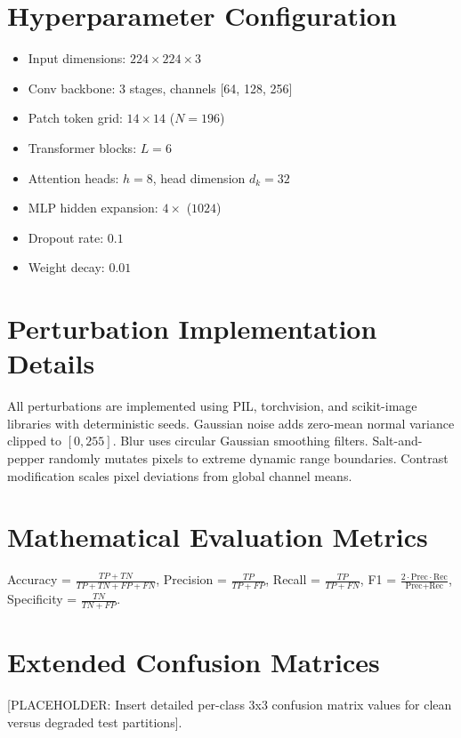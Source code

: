 \documentclass[conference]{IEEEtran}
\begin{document}



\appendices

\section{Hyperparameter Configuration}
\label{app:hyperparameters}
\begin{itemize}
    \item Input dimensions: $224 \times 224 \times 3$
    \item Conv backbone: 3 stages, channels [64, 128, 256]
    \item Patch token grid: $14 \times 14$ ($N=196$)
    \item Transformer blocks: $L = 6$
    \item Attention heads: $h = 8$, head dimension $d_k = 32$
    \item MLP hidden expansion: $4\times$ ($1024$)
    \item Dropout rate: $0.1$
    \item Weight decay: $0.01$
\end{itemize}

\section{Perturbation Implementation Details}
\label{app:perturbations}
All perturbations are implemented using PIL, torchvision, and scikit-image libraries with deterministic seeds. Gaussian noise adds zero-mean normal variance clipped to $[0, 255]$. Blur uses circular Gaussian smoothing filters. Salt-and-pepper randomly mutates pixels to extreme dynamic range boundaries. Contrast modification scales pixel deviations from global channel means.

\section{Mathematical Evaluation Metrics}
\label{app:metrics}
Accuracy = $\frac{TP+TN}{TP+TN+FP+FN}$, Precision = $\frac{TP}{TP+FP}$, Recall = $\frac{TP}{TP+FN}$, F1 = $\frac{2 \cdot \text{Prec} \cdot \text{Rec}}{\text{Prec}+\text{Rec}}$, Specificity = $\frac{TN}{TN+FP}$.

\section{Extended Confusion Matrices}
\label{app:confusion}
[PLACEHOLDER: Insert detailed per-class 3x3 confusion matrix values for clean versus degraded test partitions].
\end{document}
